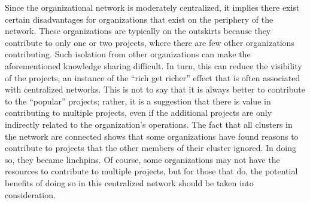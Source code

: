 Since the organizational network is moderately centralized, it implies there exist certain disadvantages for organizations that exist on the periphery of the network. These organizations are typically on the outskirts because they contribute to only one or two projects, where there are few other organizations contributing. Such isolation from other organizations can make the aforementioned knowledge sharing difficult. In turn, this can reduce the visibility of the projects, an instance of the ``rich get richer'' effect that is often associated with centralized networks. This is not to say that it is always better to contribute to the ``popular'' projects; rather, it is a suggestion that there is value in contributing to multiple projects, even if the additional projects are only indirectly related to the organization's operations. The fact that all clusters in the network are connected shows that some organizations have found reasons to contribute to projects that the other members of their cluster ignored. In doing so, they became linchpins. Of course, some organizations may not have the resources to contribute to multiple projects, but for those that do, the potential benefits of doing so in this centralized network should be taken into consideration.

